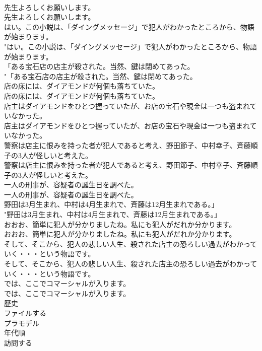 \documentclass[8pt]{extreport}
\begin{document}
\begin{CJK}{UTF8}{min}
\\	先生よろしくお願いします。	
\\	先生よろしくお願いします。 
\\	はい。この小説は、「ダイングメッセージ」で犯人がわかったところから、物語が始まります。	
\\	"はい。この小説は、「ダイングメッセージ」で犯人がわかったところから、物語が始まります。 
\\	「ある宝石店の店主が殺された。当然、鍵は閉めてあった。	
\\	"「ある宝石店の店主が殺された。当然、鍵は閉めてあった。 
\\	店の床には、ダイアモンドが何個も落ちていた。	
\\	店の床には、ダイアモンドが何個も落ちていた。 
\\	店主はダイアモンドをひとつ握っていたが、お店の宝石や現金は一つも盗まれていなかった。	
\\	店主はダイアモンドをひとつ握っていたが、お店の宝石や現金は一つも盗まれていなかった。 
\\	警察は店主に恨みを持った者が犯人であると考え、野田節子、中村幸子、斉藤順子の3人が怪しいと考えた。	
\\	警察は店主に恨みを持った者が犯人であると考え、野田節子、中村幸子、斉藤順子の3人が怪しいと考えた。 
\\	一人の刑事が、容疑者の誕生日を調べた。	
\\	一人の刑事が、容疑者の誕生日を調べた。 
\\	野田は3月生まれ、中村は4月生まれで、斉藤は12月生まれである。」	
\\	"野田は3月生まれ、中村は4月生まれで、斉藤は12月生まれである。」 
\\	おおお、簡単に犯人が分かりましたね。私にも犯人がだれか分かります。	
\\	おおお、簡単に犯人が分かりましたね。私にも犯人がだれか分かります。 
\\	そして、そこから、犯人の悲しい人生、殺された店主の恐ろしい過去がわかっていく・・・という物語です。	
\\	そして、そこから、犯人の悲しい人生、殺された店主の恐ろしい過去がわかっていく・・・という物語です。 
\\	では、ここでコマーシャルが入ります。	
\\	では、ここでコマーシャルが入ります。 
\\	歴史
\\	ファイルする
\\	プラモデル
\\	年代順
\\	訪問する

\end{CJK}
\end{document}
